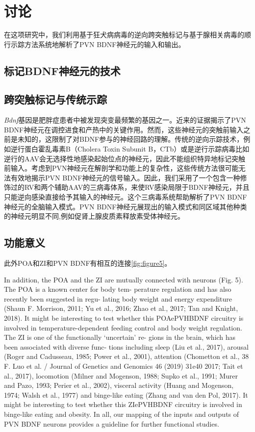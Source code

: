 \chapter{讨论}\label{chap:discussion}
在这项研究中，我们利用基于狂犬病病毒的逆向跨突触标记与基于腺相关病毒的顺行示踪方法系统地解析了PVN BDNF神经元的输入和输出。

\section{标记BDNF神经元的技术}


\section{跨突触标记与传统示踪}
\textit{Bdnf}基因是肥胖症患者中被发现突变最频繁的基因之一。近来的证据揭示了PVN BDNF神经元在调控进食和产热中的关键作用。然而，这些神经元的突触前输入之前是未知的，这限制了对BDNF参与的神经回路的理解。传统的逆向示踪技术，例如逆行蛋白霍乱毒素B（Cholera Toxin Subunit B，CTb）\citep{conte2009multiple}或是逆行示踪病毒比如逆行的AAV\citep{tervo2016designer}会无选择性地感染起始位点的神经元，因此不能组织特异地标记突触前输入。考虑到PVN神经元在解剖学和功能上的复杂性，这些传统方法很可能无法有效地揭示PVN BDNF神经元的信号输入。因此，我们采用了一个包含一种修饰过的RV和两个辅助AAV的三病毒体系，来使RV感染局限于BDNF神经元，并且只能逆向感染直接给予其输入的神经元。这个三病毒系统帮助解析了PVN BDNF神经元的全脑输入模式。PVN BDNF神经元展现出的输入模式和同区域其他种类的神经元明显不同,例如促肾上腺皮质素释放素受体神经元\citep{jiang2018local}。

\section{功能意义}




此外POA和ZI和PVN BDNF有相互的连接\figurename{\ref{fig:figure5}}。


In addition, the POA and the ZI are mutually connected with  neurons (Fig. 5). The POA is a known center for body tem- perature regulation and has also recently been suggested in regu- lating body weight and energy expenditure (Shaun F. Morrison, 2011; Yu et al., 2016; Zhao et al., 2017; Tan and Knight, 2018). It might be interesting to test whether this POAePVHBDNF circuitry is involved in temperature-dependent feeding control and body weight regulation. The ZI is one of the functionally ‘uncertain’ re- gions in the brain, which has been associated with diverse func- tions including sleep (Liu et al., 2017), arousal (Roger and Cadusseau, 1985; Power et al., 2001), attention (Chometton et al.,
38 F. Luo et al. / Journal of Genetics and Genomics 46 (2019) 31e40
2017; Tait et al., 2017), locomotion (Milner and Mogenson, 1988; Supko et al., 1991; Murer and Pazo, 1993; Perier et al., 2002), visceral activity (Huang and Mogenson, 1974; Walsh et al., 1977) and binge-like eating (Zhang and van den Pol, 2017). It might be interesting to test whether this ZIePVHBDNF circuitry is involved in binge-like eating and obesity. In all, our mapping of the inputs and outputs of PVN BDNF neurons provides a guideline for further functional studies.


